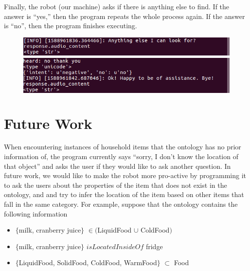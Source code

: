 \documentclass{article}
\begin{document}
Finally, the robot (our machine) asks if there is anything else to find. If 
the answer is ``yes,'' then the program repeats the whole process again.
If the answer is ``no'', then the program finishes executing.
\begin{figure}[H]
\includegraphics[width=\textwidth]{loop.png}
\includegraphics[width=\textwidth]{no.png}
\end{figure}

\section{Future Work}
When encountering instances of household items that the ontology has no 
prior information of, the program currently says ``sorry, I don't know the 
location of that object'' and asks the user if they would like to ask another
question. In future work, we would like to make the robot more pro-active by
programming it to ask the users about the properties of the item that does not
exist in the ontology, and and try to infer the location of the item based on 
other items that fall in the same category. For example, suppose that the 
ontology contains the following information
\begin{itemize}
    \item $\{$milk, cranberry juice$\}$ $\in ($LiquidFood $\cup$ ColdFood$)$
    \item $\{$milk, cranberry juice$\}$ $isLocatedInsideOf$ fridge
    \item $\{$LiquidFood, SolidFood, ColdFood, WarmFood$\}$ $\subset$ Food
\end{itemize}
\end{document}
